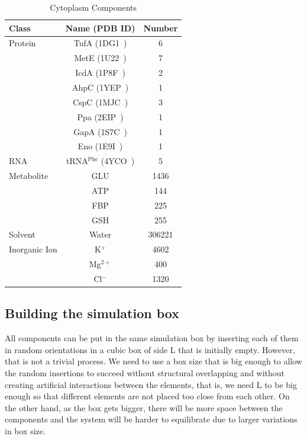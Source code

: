 \documentclass[journal=jacsat,manuscript=article]{achemso}
\begin{document}
\begin{table}
\centering
\begin{tabular}{lcc}
\hline
Class & Name (PDB ID) & Number\\
\hline
Protein & TufA (1DG1~\cite{Abel1996}) & 6\\
  & MetE (1U22~\cite{Ferrer2004}) & 7\\
  & IcdA (1P8F~\cite{Mesecar2000}) & 2\\
  & AhpC (1YEP~\cite{Parsonage2005}) & 1\\
  & CspC (1MJC~\cite{Schindelin1994}) & 3\\
  & Ppa (2EIP~\cite{Kankare1996}) & 1\\
  & GapA (1S7C~\cite{ShinXXX}) & 1\\
  & Eno (1E9I~\cite{Kuhnel2001}) & 1\\
\hline
RNA & tRNA$^{\text{Phe}}$ (4YCO~\cite{Byrne2015}) & 5\\
\hline
Metabolite & GLU & 1436\\
  & ATP & 144\\
  & FBP & 225\\
  & GSH & 255\\
\hline
Solvent & Water & 306221\\
\hline
Inorganic Ion & K$^{+}$ & 4602\\
  & Mg$^{2+}$ & 400\\
  & Cl$^{-}$ & 1320\\
\hline
\end{tabular}
\caption{Cytoplasm Components}
\label{tbl:soup_components}
\end{table}



\subsection{Building the simulation box}
All components can be put in the same simulation box by inserting each of them in random orientations in a cubic box of side L that is initially empty. However, that is not a trivial process. We need to use a box size that is big enough to allow the random insertions to succeed without structural overlapping and without creating artificial interactions between the elements, that is, we need L to be big enough so that different elements are not placed too close from each other. On the other hand, as the box gets bigger, there will be more space between the components and the system will be harder to equilibrate due to larger variations in box size.
\end{document}
